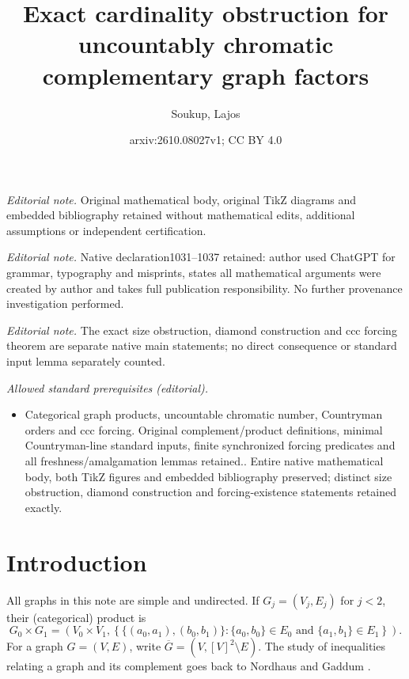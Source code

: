 \documentclass[10pt,a4paper]{amsart}
\title{Exact cardinality obstruction for uncountably chromatic complementary graph factors}
\author{Soukup, Lajos}
\date{arxiv:2610.08027v1; CC BY 4.0}
\numberwithin{equation}{section}
\theoremstyle{definition}
\theoremstyle{remark}
\begin{document}
\maketitle
\noindent\textit{Editorial note.} Original mathematical body, original TikZ diagrams and embedded bibliography retained without mathematical edits, additional assumptions or independent certification.\par\medskip
\noindent\textit{Editorial note.} Native declaration1031--1037 retained: author used ChatGPT for grammar, typography and misprints, states all mathematical arguments were created by author and takes full publication responsibility. No further provenance investigation performed.\par\medskip
\noindent\textit{Editorial note.} The exact size obstruction, diamond construction and ccc forcing theorem are separate native main statements; no direct consequence or standard input lemma separately counted.\par\medskip
\noindent\textit{Allowed standard prerequisites (editorial).}\begin{itemize}
\item Categorical graph products, uncountable chromatic number, Countryman orders and ccc forcing. Original complement/product definitions, minimal Countryman-line standard inputs, finite synchronized forcing predicates and all freshness/amalgamation lemmas retained.. Entire native mathematical body, both TikZ figures and embedded bibliography preserved; distinct size obstruction, diamond construction and forcing-existence statements retained exactly.
\end{itemize}\medskip
\section{Introduction}

All graphs in this note are simple and undirected.  If
$G_j=(V_j,E_j)$ for $j<2$, their (categorical) product is
\begin{displaymath}
 G_0\times G_1=
 \left(V_0\times V_1,
 \left\{\{(a_0,a_1),(b_0,b_1)\}:
       \{a_0,b_0\}\in E_0\text{ and }\{a_1,b_1\}\in E_1
 \right\}\right).
\end{displaymath}
For a graph $G=(V,E)$, write
$\overline G=(V,[V]^2\setminus E)$.  The study of inequalities relating
a graph and its complement goes back to Nordhaus and Gaddum
\cite{NordhausGaddum1956}.
\end{document}
